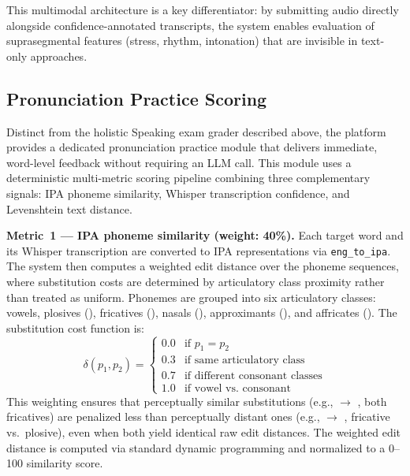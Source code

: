 \documentclass[conference]{IEEEtran}
\begin{document}
This multimodal architecture is a key differentiator: by submitting audio directly alongside confidence-annotated transcripts, the system enables evaluation of suprasegmental features (stress, rhythm, intonation) that are invisible in text-only approaches.

\subsection{Pronunciation Practice Scoring}

Distinct from the holistic Speaking exam grader described above, the platform provides a dedicated pronunciation practice module that delivers immediate, word-level feedback without requiring an LLM call. This module uses a deterministic multi-metric scoring pipeline combining three complementary signals: IPA phoneme similarity, Whisper transcription confidence, and Levenshtein text distance.

\textbf{Metric~1 --- IPA phoneme similarity (weight: 40\%).} Each target word and its Whisper transcription are converted to IPA representations via \texttt{eng\_to\_ipa}. The system then computes a weighted edit distance over the phoneme sequences, where substitution costs are determined by articulatory class proximity rather than treated as uniform. Phonemes are grouped into six articulatory classes: vowels, plosives (), fricatives (), nasals (), approximants (), and affricates (). The substitution cost function is:
\begin{equation}
\delta(p_1, p_2) = \begin{cases}
0.0 & \text{if } p_1 = p_2 \\
0.3 & \text{if same articulatory class} \\
0.7 & \text{if different consonant classes} \\
1.0 & \text{if vowel vs.\ consonant}
\end{cases}
\label{eq:phoneme_cost}
\end{equation}
This weighting ensures that perceptually similar substitutions (e.g.,  $\rightarrow$ , both fricatives) are penalized less than perceptually distant ones (e.g.,  $\rightarrow$ , fricative vs.\ plosive), even when both yield identical raw edit distances. The weighted edit distance is computed via standard dynamic programming and normalized to a 0--100 similarity score.
\end{document}
